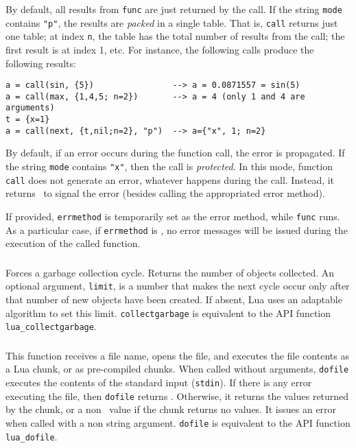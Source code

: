 By default,
all results from \verb|func| are just returned by the call.
If the string \verb|mode| contains \verb|"p"|,
the results are \emph{packed} in a single table.
That is, \verb|call| returns just one table;
at index \verb|n|, the table has the total number of results
from the call;
the first result is at index 1, etc.
For instance, the following calls produce the following results:
\begin{verbatim}
a = call(sin, {5})                --> a = 0.0871557 = sin(5)
a = call(max, {1,4,5; n=2})       --> a = 4 (only 1 and 4 are arguments)
t = {x=1}
a = call(next, {t,nil;n=2}, "p")  --> a={"x", 1; n=2}
\end{verbatim}

By default,
if an error occurs during the function call,
the error is propagated.
If the string \verb|mode| contains \verb|"x"|,
then the call is \emph{protected}.
In this mode, function \verb|call| does not generate an error,
whatever happens during the call.
Instead, it returns \nil\ to signal the error
(besides calling the appropriated error method).

If provided, \verb|errmethod| is temporarily set as the error method,
while \verb|func| runs.
As a particular case, if \verb|errmethod| is \nil,
no error messages will be issued during the execution of the called function.

\subsubsection*{\ff {}}
Forces a garbage collection cycle.
Returns the number of objects collected.
An optional argument, \verb|limit|, is a number that
makes the next cycle occur only after that number of new
objects have been created.
If absent, Lua uses an adaptable algorithm to set
this limit.
\verb|collectgarbage| is equivalent to
the API function \verb|lua_collectgarbage|.

\subsubsection*{\ff {}}
This function receives a file name,
opens the file, and executes the file contents as a Lua chunk,
or as pre-compiled chunks.
When called without arguments,
\verb|dofile| executes the contents of the standard input (\verb|stdin|).
If there is any error executing the file,
then \verb|dofile| returns \nil.
Otherwise, it returns the values returned by the chunk,
or a non \nil\ value if the chunk returns no values.
It issues an error when called with a non string argument.
\verb|dofile| is equivalent to the API function \verb|lua_dofile|.

